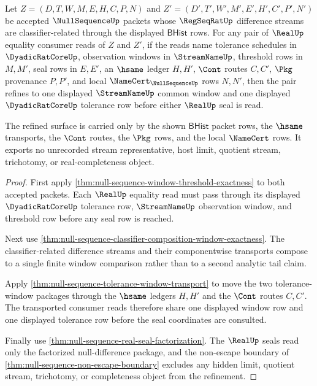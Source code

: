 \begin{theorem}
\label{thm:null-sequence-common-window-refinement}
Let $Z=(D,T,W,M,E,H,C,P,N)$ and $Z'=(D',T',W',M',E',H',C',P',N')$ be accepted $\NullSequenceUp$ packets whose $\RegSeqRatUp$ difference streams are classifier-related through the displayed $\mathsf{BHist}$ rows. For any pair of $\RealUp$ equality consumer reads of $Z$ and $Z'$, if the reads name tolerance schedules in $\DyadicRatCoreUp$, observation windows in $\StreamNameUp$, threshold rows in $M,M'$, seal rows in $E,E'$, an $\hsame$ ledger $H,H'$, $\Cont$ routes $C,C'$, $\Pkg$ provenance $P,P'$, and local $\NameCert_{\NullSequenceUp}$ rows $N,N'$, then the pair refines to one displayed $\StreamNameUp$ common window and one displayed $\DyadicRatCoreUp$ tolerance row before either $\RealUp$ seal is read.

The refined surface is carried only by the shown $\mathsf{BHist}$ packet rows, the $\hsame$ transports, the $\Cont$ routes, the $\Pkg$ rows, and the local $\NameCert$ rows. It exports no unrecorded stream representative, host limit, quotient stream, trichotomy, or real-completeness object.
\end{theorem}
\begin{proof}
First apply \autoref{thm:null-sequence-window-threshold-exactness} to both accepted packets. Each $\RealUp$ equality read must pass through its displayed $\DyadicRatCoreUp$ tolerance row, $\StreamNameUp$ observation window, and threshold row before any seal row is reached.

Next use \autoref{thm:null-sequence-classifier-composition-window-exactness}. The classifier-related difference streams and their componentwise transports compose to a single finite window comparison rather than to a second analytic tail claim.

Apply \autoref{thm:null-sequence-tolerance-window-transport} to move the two tolerance-window packages through the $\hsame$ ledgers $H,H'$ and the $\Cont$ routes $C,C'$. The transported consumer reads therefore share one displayed window row and one displayed tolerance row before the seal coordinates are consulted.

Finally use \autoref{thm:null-sequence-real-seal-factorization}. The $\RealUp$ seals read only the factorized null-difference package, and the non-escape boundary of \autoref{thm:null-sequence-non-escape-boundary} excludes any hidden limit, quotient stream, trichotomy, or completeness object from the refinement.
\end{proof}

